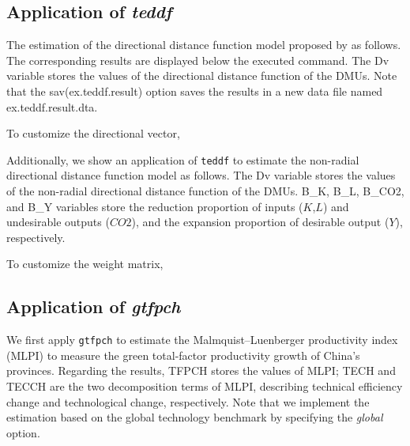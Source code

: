 \begin{stlog}
	
\end{stlog}


\subsection{Application of \textit{teddf}}
The estimation of the directional distance function model proposed by \cite{Chung1997} as follows. The corresponding results are displayed below the executed command. The Dv variable stores the values of the directional distance function of the DMUs. Note that the sav(ex.teddf.result) option saves the results in a new data file named ex.teddf.result.dta.

\begin{stlog}
	
\end{stlog}

To customize the directional vector, 
\begin{stlog}
	
\end{stlog}

Additionally, we show an application of {\tt teddf} to estimate the non-radial directional distance function model as follows. The Dv variable stores the values of the non-radial directional distance function of the DMUs. B\_K, B\_L, B\_CO2, and B\_Y variables store the reduction proportion of inputs ($K$,$L$) and undesirable outputs ($CO2$), and the expansion proportion of desirable output ($Y$), respectively.

\begin{stlog}
	
\end{stlog}

To customize the weight matrix, 
\begin{stlog}
	
\end{stlog}


\subsection{Application of \textit{gtfpch}}
We first apply {\tt gtfpch} to estimate the Malmquist–Luenberger productivity index (MLPI) to measure the green total-factor productivity growth of China's provinces. Regarding the results, TFPCH stores the values of MLPI; TECH and TECCH are the two decomposition terms of MLPI, describing technical efficiency change and technological change, respectively. Note that we implement the estimation based on the global technology benchmark by specifying the \textit{global} option.

